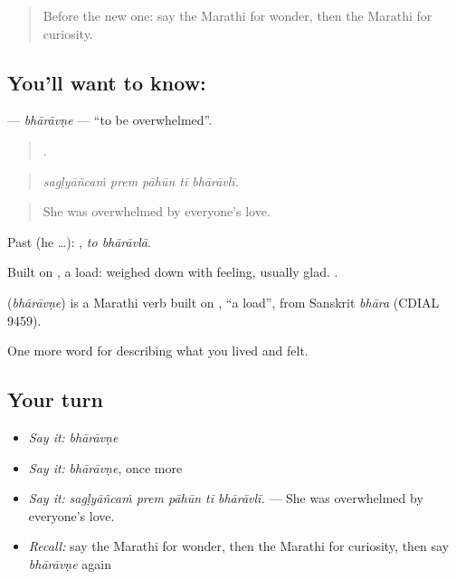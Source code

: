 \label{lesson:MR-C465-bharavne}



\begin{quote}
Before the new one: say the Marathi for wonder, then the Marathi for curiosity.
\end{quote}

\subsection*{You'll want to know: }
\textbf{} — \emph{bhārāvṇe} — \textquotedblleft{}to be overwhelmed\textquotedblright{}.

\begin{quote}
    .
\end{quote}

\begin{quote}
\emph{sagḷyāñcaṁ prem pāhūn tī bhārāvlī.}
\end{quote}

\begin{quote}
She was overwhelmed by everyone's love.
\end{quote}

Past (he …):  , \emph{to bhārāvlā}.

Built on , a load: weighed down with feeling, usually glad.  .

\begin{cousinweb}
\textbf{} (\emph{bhārāvṇe}) is a Marathi verb built on , \textquotedblleft{}a load\textquotedblright{}, from Sanskrit \emph{bhāra} (CDIAL 9459).
\end{cousinweb}

\begin{grammarlens}[title={What you've built}]
One more word for describing what you lived and felt.
\end{grammarlens}

\subsection*{Your turn}
\begin{itemize}
\raggedright
  \item \emph{Say it:} \emph{bhārāvṇe}
  \item \emph{Say it:} \emph{bhārāvṇe}, once more
  \item \emph{Say it:} \emph{sagḷyāñcaṁ prem pāhūn tī bhārāvlī.} — She was overwhelmed by everyone's love.
  \item \emph{Recall:} say the Marathi for wonder, then the Marathi for curiosity, then say \emph{bhārāvṇe} again
\end{itemize}


